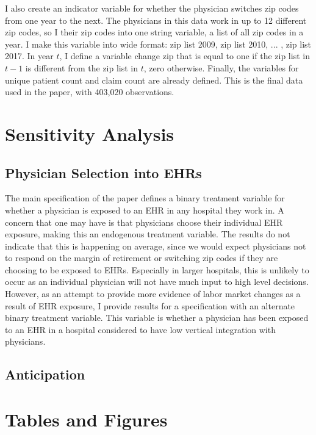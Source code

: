 \documentclass[11pt]{article}
\begin{document}
I also create an indicator variable for whether the physician switches zip codes from one year to the next. The physicians in this data work in up to 12 different zip codes, so I their zip codes into one string variable, a list of all zip codes in a year. I make this variable into wide format: zip list 2009, zip list 2010, ... , zip list 2017.  In year $t$, I define a variable change zip that is equal to one if the zip list in $t-1$ is different from the zip list in $t$, zero otherwise. Finally, the variables for unique patient count and claim count are already defined. This is the final data used in the paper, with 403,020 observations. 



\section{Sensitivity Analysis}

\subsection{Physician Selection into EHRs}\label{sec:endog}

The main specification of the paper defines a binary treatment variable for whether a physician is exposed to an EHR in any hospital they work in. A concern that one may have is that physicians choose their individual EHR exposure, making this an endogenous treatment variable. The results do not indicate that this is happening on average, since we would expect physicians not to respond on the margin of retirement or switching zip codes if they are choosing to be exposed to EHRs. Especially in larger hospitals, this is unlikely to occur as an individual physician will not have much input to high level decisions. However, as an attempt to provide more evidence of labor market changes as a result of EHR exposure, I provide results for a specification with an alternate binary treatment variable. This variable is whether a physician has been exposed to an EHR in a hospital considered to have low vertical integration with physicians. 



\subsection{Anticipation}


\clearpage

\section{Tables and Figures}
\end{document}
